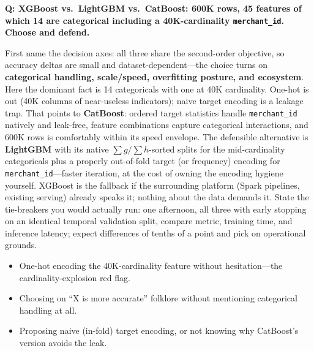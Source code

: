 \begin{interviewq}
\textbf{Q: XGBoost vs.\ LightGBM vs.\ CatBoost: 600K rows, 45 features of which 14 are categorical including a 40K-cardinality \texttt{merchant\_id}. Choose and defend.}

 \quad {} \quad \badgefreq{\freqhigh}

\stronganswer

First name the decision axes: all three share the second-order objective, so accuracy deltas are small and dataset-dependent---the choice turns on \textbf{categorical handling, scale/speed, overfitting posture, and ecosystem}. Here the dominant fact is 14 categoricals with one at 40K cardinality. One-hot is out (40K columns of near-useless indicators); naive target encoding is a leakage trap. That points to \textbf{CatBoost}: ordered target statistics handle \texttt{merchant\_id} natively and leak-free, feature combinations capture categorical interactions, and 600K rows is comfortably within its speed envelope. The defensible alternative is \textbf{LightGBM} with its native $\sum g / \sum h$-sorted splits for the mid-cardinality categoricals plus a properly out-of-fold target (or frequency) encoding for \texttt{merchant\_id}---faster iteration, at the cost of owning the encoding hygiene yourself. XGBoost is the fallback if the surrounding platform (Spark pipelines, existing serving) already speaks it; nothing about the data demands it. State the tie-breakers you would actually run: one afternoon, all three with early stopping on an identical temporal validation split, compare metric, training time, and inference latency; expect differences of tenths of a point and pick on operational grounds.

\redflags
\begin{itemize}
    \item One-hot encoding the 40K-cardinality feature without hesitation---the cardinality-explosion red flag.
    \item Choosing on ``X is more accurate'' folklore without mentioning categorical handling at all.
    \item Proposing naive (in-fold) target encoding, or not knowing why CatBoost's version avoids the leak.
\end{itemize}



\end{interviewq}
